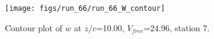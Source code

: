 \begin{figure}[H]
\centering
\texttt{[image: figs/run\_66/run\_66\_W\_contour]}
\caption{Contour plot of $\overline{w}$ at $z/c$=10.00, $V_{free}$=24.96, station 7.}
\label{fig:run_66_W_contour}
\end{figure}


